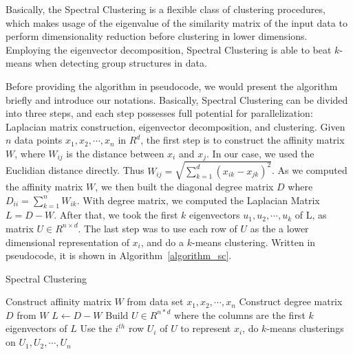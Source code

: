 \documentclass{acm_proc_article-sp}
\begin{document}
Basically, the Spectral Clustering is a flexible class of clustering procedures, which makes usage of the eigenvalue of the similarity matrix of the input data to perform dimensionality reduction before clustering in lower dimensions. Employing the eigenvector decomposition, Spectral Clustering is able to beat $k$-means when detecting group structures in data.

Before providing the algorithm in pseudocode, we would present the algorithm briefly and introduce our notations. Basically, Spectral Clustering can be divided into three steps, and each step possesses full potential for parallelization: Laplacian matrix construction, eigenvector decomposition, and clustering. Given $n$ data points $x_1, x_2, \cdots, x_n$ in $R^d$, the first step is to construct the affinity matrix $W$, where $W_{ij}$ is the distance between $x_i$ and $x_j$. In our case, we used the Euclidian distance directly. Thus $W_{ij} = \sqrt{\sum_{k=1}^d(x_{ik} - x_{jk})^2}$. As we computed the affinity matrix $W$, we then built the diagonal degree matrix $D$ where $D_{ii} = \sum_{k=1}^nW_{ik}$. With degree matrix, we computed the Laplacian Matrix $L = D - W$. After that, we took the first $k$ eigenvectors $u_1, u_2, \cdots, u_k$ of L, as matrix $U \in R^{n\times d}$. The last step was to use each row of $U$ as the a lower dimensional representation of $x_i$, and do a $k$-means clustering. 
Written in pseudocode, it is shown in Algorithm~\ref{algorithm_sc}.
\begin{algorithm}
\caption{Spectral Clustering}
\label{CHalgorithm}
\begin{algorithmic}[1]
\State Construct affinity matrix $W$ from data set $x_1, x_2, \cdots, x_n$
\State Construct degree matrix $D$ from $W$
\State $L \leftarrow D - W$
\State Build $U \in R^{n*d}$ where the columns are the first $k$ eigenvectors of $L$ 
\State Use the $i^{th}$ row $U_i$ of $U$ to represent $x_i$, do $k$-means clusterings on $U_1, U_2, \cdots, U_n$
\end{algorithmic}
\label{algorithm_sc}
\end{algorithm}
\end{document}
